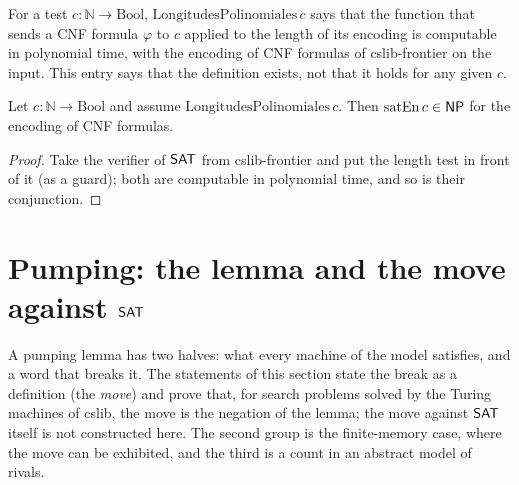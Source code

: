 \begin{definition}
  \label{def:structure-longitudes-polinomiales}
  \leanok
  For a test $c : \mathbb{N} \to \mathrm{Bool}$, $\mathrm{LongitudesPolinomiales}\,c$ says that the
  function that sends a CNF formula $\varphi$ to $c$ applied to the length of its encoding is
  computable in polynomial time, with the encoding of CNF formulas of cslib-frontier on the input.
  This entry says that the definition exists, not that it holds for any given $c$.
  \own{}
\end{definition}

\begin{theorem}
  \label{thm:structure-sat-en-np}
  \leanok
  Let $c : \mathbb{N} \to \mathrm{Bool}$ and assume $\mathrm{LongitudesPolinomiales}\,c$. Then
  $\mathrm{satEn}\,c \in \mathsf{NP}$ for the encoding of CNF formulas.
  \own{}
\end{theorem}

\begin{proof}
  \leanok
  Take the verifier of $\mathsf{SAT}$ from cslib-frontier and put the length test in front of it
  (as a guard); both are computable in polynomial time, and so is their conjunction.
\end{proof}

\section{Pumping: the lemma and the move against $\mathsf{SAT}$}
\label{sec:structure-pumping}

A pumping lemma has two halves: what every machine of the model satisfies, and a word that breaks it.
The statements of this section state the break as a definition (the \emph{move}) and prove that, for
search problems solved by the Turing machines of cslib, the move is the negation of the lemma; the
move against $\mathsf{SAT}$ itself is not constructed here. The second group is the finite-memory case, where the move
can be exhibited, and the third is a count in an abstract model of rivals.

